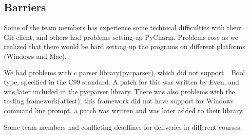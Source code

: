 \subsection{Barriers}
Some of the team members has experience some technical difficulties with their Git client, and others had problems setting up PyCharm. Problems rose as we realized that there would be hard setting up the programs on different platforms (Windows and Mac).

We had problems with c parser library(pycparser), which did not support \_Bool type, specified in the C99 standard. A patch for this was written by Even, and was later included in the pycparser library. There was also problems with the testing framework(attest), this framework did not have support for Windows command line prompt, a patch was written and was later added to their library.

Some team members had conflicting deadlines for deliveries in different courses.  